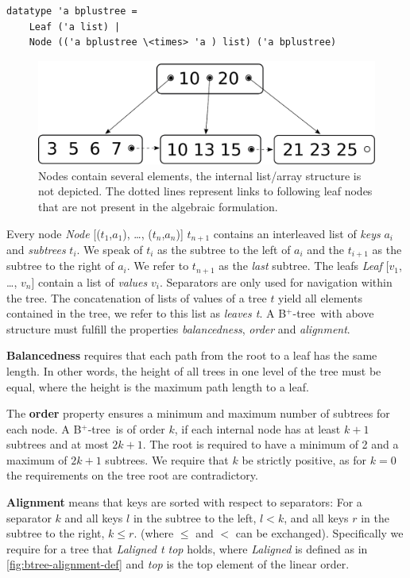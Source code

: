 \documentclass[a4paper,UKenglish,cleveref, autoref, thm-restate]{lipics-v2021}
\newcommand{\btree}{B$^+$-tree}
\begin{document}
\begin{lstlisting}[mathescape=true, language=Isabelle,label=lst:btree-def]
datatype 'a bplustree =
    Leaf ('a list) |
    Node (('a bplustree \<times> 'a ) list) ('a bplustree)
\end{lstlisting}


\begin{figure}
    \centering
    \includegraphics[width=0.5\linewidth]{btree-basic-nopair.pdf}
    \caption[Visualization of a \btree]
    {Nodes contain several elements, the internal list/array structure is not depicted.
    The dotted lines represent links to following leaf nodes that are not present in the algebraic formulation.}
    \label{fig:btree-basic}
\end{figure}


Every node \emph{Node} [($t_1$,$a_1$), …, ($t_n$,$a_n$)] $t_{n+1}$ contains an interleaved list of \textit{keys} $a_i$ and \textit{subtrees} $t_i$.
We speak of $t_i$ as the subtree to the left of $a_i$ and
the $t_{i+1}$ as the subtree to the right of $a_i$.
We refer to $t_{n+1}$ as the \textit{last} subtree.
The leafs \emph{Leaf} [$v_1$, …, $v_n$] contain a list of \textit{values} $v_i$.
Separators are only used for navigation within the tree.
The concatenation of lists of values of a tree $t$ yield
all elements contained in the tree, we refer to this list as \emph{leaves t}.
A \btree\ with above structure must fulfill the properties
\textit{balancedness}, \textit{order} and \textit{alignment}.

\textbf{Balancedness} requires
that each path from the root to a leaf has the same length.
In other words, the height of all trees in one level of the tree must be equal,
where the height is the maximum path length to a leaf.

The \textbf{order} property ensures a minimum and maximum
number of subtrees for each node.
A \btree\ is of order $k$, if each internal node has at least $k+1$
subtrees and at most $2k+1$.
The root is required to have a minimum of 2 and a maximum of $2k+1$ subtrees.
We require that $k$ be strictly positive, as for $k = 0$ the requirements on the tree
root are contradictory.

\textbf{Alignment} means that keys are sorted with respect to separators:
For a separator $k$ and all keys $l$ in the subtree to the left, $l < k$,
and all keys $r$ in the subtree to the right, $k \leq r$.
(where $\leq$ and $<$ can be exchanged).
Specifically we require for a tree that \emph{Laligned t top}
holds, where \emph{Laligned} is defined as in \autoref{fig:btree-alignment-def} and \emph{top} is the top element of the linear order. 
\end{document}

